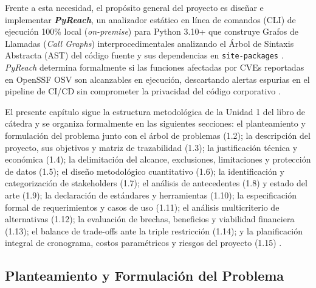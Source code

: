 Frente a esta necesidad, el propósito general del proyecto es diseñar e implementar \textbf{\textit{PyReach}}, un analizador estático en línea de comandos (CLI) de ejecución 100\% local (\textit{on-premise}) para Python 3.10+ que construye Grafos de Llamadas (\textit{Call Graphs}) interprocedimentales analizando el Árbol de Sintaxis Abstracta (AST) del código fuente y sus dependencias en \texttt{site-packages} \parencite{salis2021pycg, ryder1979constructing}. %
\textit{PyReach} determina formalmente si las funciones afectadas por CVEs reportadas en OpenSSF OSV son alcanzables en ejecución, descartando alertas espurias en el pipeline de CI/CD sin comprometer la privacidad del código corporativo \parencite{openssf2023osv, oasis2019sarif, humble2010continuous}. %

El presente capítulo sigue la estructura metodológica de la Unidad 1 del libro de cátedra \parencite{torres2026proyecto} %
y se organiza formalmente en las siguientes secciones: el planteamiento y formulación del problema junto con el árbol de problemas (1.2); %
la descripción del proyecto, sus objetivos y matriz de trazabilidad (1.3); %
la justificación técnica y económica (1.4); %
la delimitación del alcance, exclusiones, limitaciones y protección de datos (1.5); %
el diseño metodológico cuantitativo (1.6); %
la identificación y categorización de stakeholders (1.7); %
el análisis de antecedentes (1.8) y estado del arte (1.9); %
la declaración de estándares y herramientas (1.10); %
la especificación formal de requerimientos y casos de uso (1.11); %
el análisis multicriterio de alternativas (1.12); %
la evaluación de brechas, beneficios y viabilidad financiera (1.13); %
el balance de trade-offs ante la triple restricción (1.14); %
y la planificación integral de cronograma, costos paramétricos y riesgos del proyecto (1.15) \parencite{pmi2021pmbok, wiegers2013software, torres2026proyecto}. %

\subsection{Planteamiento y Formulación del Problema}

